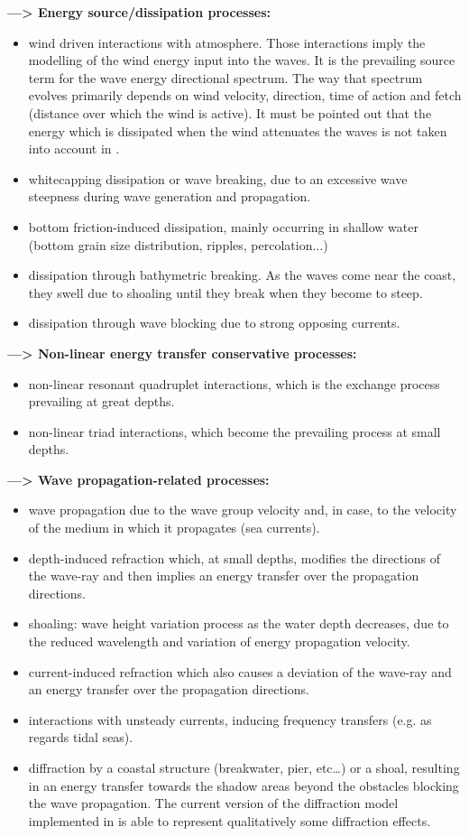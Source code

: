 {\bf—> Energy source/dissipation processes:}
\begin{itemize}
\item wind driven interactions with atmosphere. Those interactions imply the modelling of the wind energy input into the waves. It is the prevailing source term for the wave energy directional spectrum. The way that spectrum evolves primarily depends on wind velocity, direction, time of action and fetch (distance over which the wind is active). It must be pointed out that the energy which is dissipated when the wind attenuates the waves is not taken into account in \tomawac.
\item 	whitecapping dissipation or wave breaking, due to an excessive wave steepness during wave generation and propagation.
\item 	bottom friction-induced dissipation, mainly occurring in shallow water (bottom grain size distribution, ripples, percolation...)
\item 	dissipation through bathymetric breaking. As the waves come near the coast, they swell due to shoaling until they break when they become to steep.
\item dissipation through wave blocking due to strong opposing currents.
\end{itemize}
{\bf—> Non-linear energy transfer conservative processes:}
\begin{itemize}
\item 	non-linear resonant quadruplet interactions, which is the exchange process prevailing at great depths.
\item 		non-linear triad interactions, which become the prevailing process at small depths.
\end{itemize}
{\bf—> Wave propagation-related processes:}
\begin{itemize}
\item 	 wave propagation due to the wave group velocity and, in case, to the velocity of the medium in which it propagates (sea currents).
\item 	depth-induced refraction which, at small depths, modifies the directions of the wave-ray and then implies an energy transfer over the propagation directions.
\item 	shoaling: wave height variation process as the water depth decreases, due to the reduced wavelength and variation of energy propagation velocity.
\item 	current-induced refraction which also causes a deviation of the wave-ray and an energy transfer over the propagation directions.
\item 	interactions with unsteady currents, inducing frequency transfers (e.g. as regards tidal seas).
\item 	diffraction by a coastal structure (breakwater, pier, etc…) or a shoal, resulting in an energy transfer towards the shadow areas beyond the obstacles blocking the wave propagation. The current version of the diffraction model implemented in \tomawac is able to represent qualitatively some diffraction effects.
\end{itemize}

